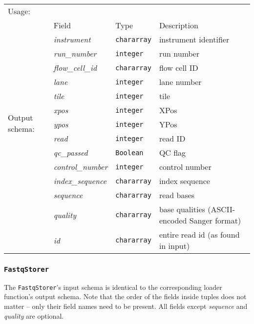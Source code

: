 \begin{tabular}{lp{}p{}p{}}
Usage: & \multicolumn{3}{l}{}
\hspace*{-0.55cm}\begin{minipage}{0.8\textwidth}
  \begin{lstlisting}
  reads = load 'input.fq' using FastqLoader();
  \end{lstlisting}
  \end{minipage}\hfill\kern-\arrayrulewidth
 \\[0.25cm]
\multirow{14}{*}{Output schema:} & Field & Type & Description\\[0.1cm]
& \emph{instrument} & \texttt{chararray} & instrument identifier\\
& \emph{run\_number} & \texttt{integer} & run number\\
& \emph{flow\_cell\_id} & \texttt{chararray} & flow cell ID\\
& \emph{lane} & \texttt{integer} & lane number\\
& \emph{tile} & \texttt{integer} & tile\\
& \emph{xpos} & \texttt{integer} & XPos\\
& \emph{ypos} & \texttt{integer} & YPos\\
& \emph{read} & \texttt{integer} & read ID\\
& \emph{qc\_passed} & \texttt{Boolean} & QC flag\\
& \emph{control\_number} & \texttt{integer} & control number\\
& \emph{index\_sequence} & \texttt{chararray} & index sequence\\
& \emph{sequence} & \texttt{chararray} & read bases\\
& \emph{quality} & \texttt{chararray} & base qualities (ASCII-encoded Sanger
format)\\
& \emph{id} & \texttt{chararray} & entire read id (as found in input)
\end{tabular}

\subsubsection{\texttt{FastqStorer}}

The \texttt{FastqStorer}'s input schema is identical to the corresponding loader
function's output schema. Note that the order of the fields inside tuples does
not matter -- only their field names need to be present. All fields except
\emph{sequence} and \emph{quality} are optional.

